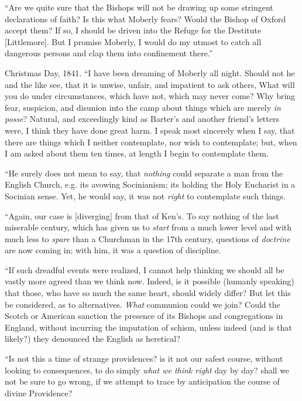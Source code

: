 ``Are we quite sure that the Bishops will not be drawing up some
stringent declarations of faith? Is this what Moberly fears? Would the
Bishop of Oxford accept them? If so, I should be driven into the Refuge
for the Destitute [Littlemore]. But I promise Moberly, I would do
my utmost to catch all dangerous persons and clap them into confinement
there.''

Christmas Day, 1841. ``I have been dreaming of Moberly all night.
Should not he and the like see, that it is unwise, unfair, and impatient
to ask others, What will you do under circumstances, which have not,
which may never come? Why bring fear, suspicion, and disunion into the
camp about things which are merely \emph{in posse}? Natural, and
exceedingly kind as Barter's and another friend's letters were, I think
they have done great harm. I speak most sincerely when I say, that there
are things which I neither contemplate, nor wish to contemplate; but,
when I am asked about them ten times, at length I begin to contemplate
them.

``He surely does not mean to say, that \emph{nothing} could separate a
man from the English Church, e.g. its avowing Socinianism; its holding
the Holy Eucharist in a Socinian sense. Yet, he would say, it was not \emph{right}
to contemplate such things.

``Again, our case is [diverging] from that of Ken's. To
say nothing of the last miserable century, which has given us to \emph{start}
from a much lower level and with much less to \emph{spare} than a
Churchman in the 17th century, questions of \emph{doctrine} are now
coming in; with him, it was a question of discipline.

``If such dreadful events were realized, I cannot help thinking
we should all be vastly more agreed than we think now. Indeed, is it
possible (humanly speaking) that those, who have so much the same heart,
should widely differ? But let this be considered, as to alternatives. \emph{What}
communion could we join? Could the Scotch or American sanction the
presence of its Bishops and congregations in England, without incurring
the imputation of schism, unless indeed (and is that likely?) they
denounced the English as heretical?

``Is not this a time of strange providences? is it not our safest
course, without looking to consequences, to do simply \emph{what we think
right} day by day? shall we not be sure to go wrong, if we
attempt to trace by anticipation the course of divine Providence?

